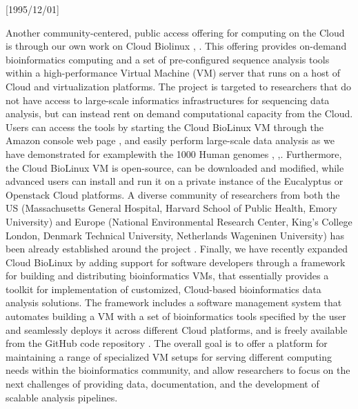 \NeedsTeXFormat{LaTeX2e}[1995/12/01] \documentclass[10pt]{bmc_article}
\newenvironment{bmcformat}{\begin{raggedright}\baselineskip20pt\sloppy\setboolean{publ}{false}}{\end{raggedright}\baselineskip20pt\sloppy}
\begin{document}
\begin{bmcformat}
Another community-centered, public access offering for computing on the Cloud is through our own work on Cloud Biolinux 
\cite{Krampis2012}, \cite{cloudbio}. This offering provides on-demand bioinformatics computing and a set of pre-configured 
sequence analysis tools within a high-performance Virtual Machine (VM) server that runs on a host of Cloud and virtualization 
platforms. The project is targeted to researchers that do not have access to large-scale informatics infrastructures for 
sequencing data analysis, but can instead rent on demand computational capacity from the Cloud. Users can access 
the tools by starting the Cloud BioLinux VM through the Amazon console web page \cite{console}, and  easily perform 
large-scale data analysis as we have demonstrated for examplewith the 1000 Human genomes \cite{1000tube1}, 
\cite{1000tube2},\cite{Clarke2012}.  Furthermore, the Cloud BioLinux VM is open-source, can be downloaded and modified, 
while advanced users can install  and run it on a private instance of the Eucalyptus \cite{euca} or Openstack \cite{openstack} Cloud platforms. A diverse 
community of researchers from both the US (Massachusetts General Hospital, Harvard School of Public Health, Emory 
University) and Europe (National Environmental Research Center, King's College London, Denmark Technical University, 
Netherlands Wageninen University) has been already established around the project \cite{googlegroup}. Finally, we have 
recently  expanded Cloud BioLinux by adding support for software developers through a framework for building 
and distributing bioinformatics VMs, that essentially provides a toolkit for implementation of customized, Cloud-based 
bioinformatics data analysis solutions. The framework includes a software management system that automates 
building a VM with a set of bioinformatics tools specified by the user and seamlessly deploys it across different
Cloud platforms, and is freely available from the GitHub code repository \cite{fabric}.  The overall goal is
to offer a platform for maintaining a range of specialized VM setups for serving different computing needs
within the bioinformatics community, and allow researchers to focus on the next challenges of providing data,
documentation, and the development of scalable analysis pipelines. \pb


\end{bmcformat}
\end{document}
